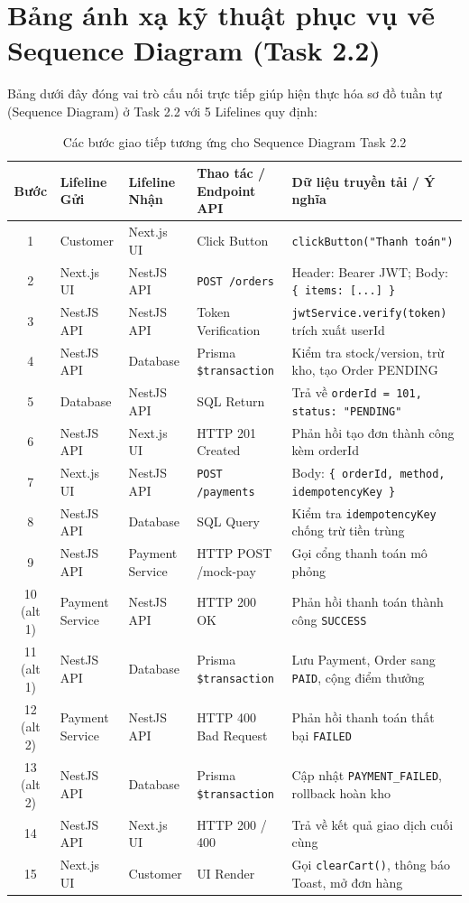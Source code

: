\documentclass[12pt,a4paper]{article}
\begin{document}
\section{Bảng ánh xạ kỹ thuật phục vụ vẽ Sequence Diagram (Task 2.2)}

Bảng dưới đây đóng vai trò cấu nối trực tiếp giúp hiện thực hóa sơ đồ tuần tự (Sequence Diagram) ở Task 2.2 với 5 Lifelines quy định:

\begin{table}[H]
\centering
\scriptsize
\begin{tabularx}{\textwidth}{c l l p{3.2cm} X}
\toprule
\rowcolor{tableheader}
\textbf{Bước} & \textbf{Lifeline Gửi} & \textbf{Lifeline Nhận} & \textbf{Thao tác / Endpoint API} & \textbf{Dữ liệu truyền tải / Ý nghĩa} \\
\midrule
1 & Customer & Next.js UI & Click Button & \texttt{clickButton("Thanh toán")} \\
2 & Next.js UI & NestJS API & \texttt{POST /orders} & Header: Bearer JWT; Body: \texttt{\{ items: [...] \}} \\
3 & NestJS API & NestJS API & Token Verification & \texttt{jwtService.verify(token)} trích xuất userId \\
4 & NestJS API & Database & Prisma \texttt{\$transaction} & Kiểm tra stock/version, trừ kho, tạo Order PENDING \\
5 & Database & NestJS API & SQL Return & Trả về \texttt{orderId = 101, status: "PENDING"} \\
6 & NestJS API & Next.js UI & HTTP 201 Created & Phản hồi tạo đơn thành công kèm orderId \\
7 & Next.js UI & NestJS API & \texttt{POST /payments} & Body: \texttt{\{ orderId, method, idempotencyKey \}} \\
8 & NestJS API & Database & SQL Query & Kiểm tra \texttt{idempotencyKey} chống trừ tiền trùng \\
9 & NestJS API & Payment Service & HTTP POST /mock-pay & Gọi cổng thanh toán mô phỏng \\
10 (alt 1) & Payment Service & NestJS API & HTTP 200 OK & Phản hồi thanh toán thành công \texttt{SUCCESS} \\
11 (alt 1) & NestJS API & Database & Prisma \texttt{\$transaction} & Lưu Payment, Order sang \texttt{PAID}, cộng điểm thưởng \\
12 (alt 2) & Payment Service & NestJS API & HTTP 400 Bad Request & Phản hồi thanh toán thất bại \texttt{FAILED} \\
13 (alt 2) & NestJS API & Database & Prisma \texttt{\$transaction} & Cập nhật \texttt{PAYMENT\_FAILED}, rollback hoàn kho \\
14 & NestJS API & Next.js UI & HTTP 200 / 400 & Trả về kết quả giao dịch cuối cùng \\
15 & Next.js UI & Customer & UI Render & Gọi \texttt{clearCart()}, thông báo Toast, mở đơn hàng \\
\bottomrule
\end{tabularx}
\caption{Các bước giao tiếp tương ứng cho Sequence Diagram Task 2.2}
\end{table}
\end{document}
